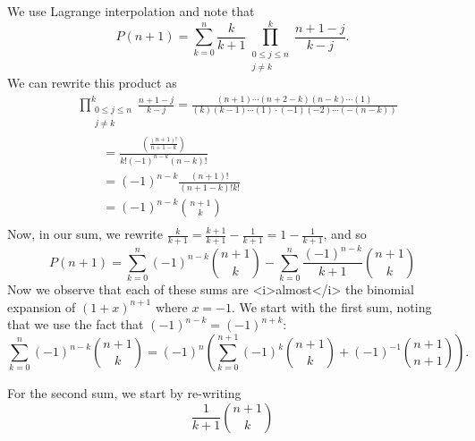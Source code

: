 \documentclass{article}
\begin{document}
We use Lagrange interpolation and note that \[
      P(n+1) = \sum_{k=0}^{n} \frac{k}{k+1}\prod_{\substack{0 \le j \le n \\ j \neq k}}^k \frac{n+1-j}{k-j}.
    \] We can rewrite this product as
      \begin{align}
        &\prod_{\substack{0 \le j \le n \\ j \neq k}}^k \frac{n+1-j}{k-j}
        =
        \frac{(n+1)\cdots(n+2-k)(n-k)\cdots(1)}{(k)(k-1)\cdots(1)\cdot(-1)(-2)\cdots(-(n-k))} \\
        &\qquad= \frac{\displaystyle\left(\frac{(n+1)!}{n+1-k}\right)}{k!(-1)^{n-k}(n-k)!} \\
        &\qquad= (-1)^{n-k}\frac{(n+1)!}{(n+1-k)!k!} \\
        &\qquad= (-1)^{n-k}\binom{n+1}{k} \\
      \end{align}
    Now, in our sum, we rewrite $\frac{k}{k+1} = \frac{k+1}{k+1}-\frac{1}{k+1} = 1-\frac{1}{k+1}$, and so \[
      P(n+1) = \sum_{k=0}^{n} (-1)^{n-k}\binom{n+1}{k} - \sum_{k=0}^{n} \frac{(-1)^{n-k}}{k+1}\binom{n+1}{k}
    \]
    Now we observe that each of these sums are <i>almost</i> the binomial expansion of $(1+x)^{n+1}$ where $x = -1$. We start with the first sum, noting that we use the fact that $(-1)^{n-k} = (-1)^{n+k}$:
    \[
      \sum_{k=0}^{n} (-1)^{n-k}\binom{n+1}{k} = (-1)^n \left(\sum_{k=0}^{n+1} (-1)^{k}\binom{n+1}{k} + (-1)^{-1} \binom{n+1}{n+1}\right).
    \]

    For the second sum, we start by re-writing
    \[
      \frac{1}{k+1}\binom{n+1}{k}
    \]
\end{document}
